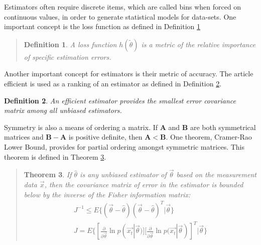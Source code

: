 \documentclass[11pt]{article}
\newtheorem{thm}{Theorem}[section]
\newtheorem{adef}[thm]{Definition}
\begin{document}
Estimators often %
require discrete items, which are called bins when forced on continuous values, in order to generate statistical models for data-sets.  One important concept is the loss function as defined in Definition \ref{lossFunctionDefition}
\begin{quote}
\begin{adef}
	\label{lossFunctionDefition}
A loss function $h(\tilde{\theta})$ is a metric of the relative importance of specific estimation errors.
\end{adef}
\cite[79]{appo-ica-book}
\end{quote}
Another important concept for estimators is %
their metric of accuracy.  The article efficient is used as a ranking of an estimator as defined in Definition \ref{efficientEstimatorDefinition}.
	\begin{adef}
		\label{efficientEstimatorDefinition}
An efficient estimator provides the smallest error covariance matrix among all unbiased estimators.	
	\end{adef}
\cite[81]{appo-ica-book}
Symmetry is also a means of ordering a matrix.  If $\mathbf{A}$ and $\mathbf{B}$ are both symmetrical matrices and $\mathbf{B} - \mathbf{A}$ is positive definite, then $\mathbf{A} < \mathbf{B}$.  One theorem, Cramer-Rao Lower Bound, provides for partial ordering amongst symmetric matrices.   This theorem is defined in Theorem \ref{cramerRaoLowerBound}.

\begin{quote}
	\begin{thm}
	\label{cramerRaoLowerBound}
If $\hat{\theta}$ is any unbiased estimator of $\vec{\theta}$ based on the measurement data $\vec{x}$, then the covariance matrix of error in the estimator is bounded below by the inverse of the Fisher information matrix:
\begin{eqnarray}
J^{-1} \le E \{ (\vec{\theta} - \hat{\theta})(\vec{\theta} - \hat{\theta})^T | \vec{\theta} \} \\
J = E \{ [\frac {\partial} {\partial \vec{\theta}} \ln p(\vec{x_t} | \vec{\theta})] [\frac {\partial} {\partial \vec{\theta}} \ln p(\vec{x_t} | \vec{\theta})]^T | \vec{\theta} \}
\end{eqnarray}
	\end{thm}
\cite[83]{appo-ica-book}
\end{quote}
\end{document}
